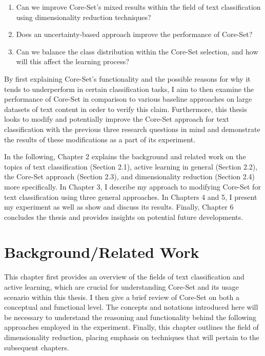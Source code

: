 \documentclass[english,bachelor,ul]{webisthesis} %
\begin{document}
\begin{enumerate}
    \item Can we improve Core-Set's mixed results within the field of text classification using dimensionality reduction techniques?
    \item Does an uncertainty-based approach improve the performance of Core-Set?
    \item Can we balance the class distribution within the Core-Set selection, and how will this affect the learning process?
\end{enumerate}



By first explaining Core-Set's functionality and the possible reasons for why it tends to underperform in certain classification tasks, I aim to then examine the performance of Core-Set in comparison to various baseline approaches on large datasets of text content in order to verify this claim. Furthermore, this thesis looks to modify and potentially improve the Core-Set approach for text classification with the previous three research questions in mind and demonstrate the results of these modifications as a part of its experiment.

In the following, Chapter 2 explains the background and related work on the topics of text classification (Section 2.1), active learning in general (Section 2.2), the Core-Set approach (Section 2.3), and dimensionality reduction (Section 2.4) more specifically. In Chapter 3, I describe my approach to modifying Core-Set for text classification using three general approaches. In Chapters 4 and 5, I present my experiment as well as show and discuss its results. Finally, Chapter 6 concludes the thesis and provides insights on potential future developments. 

\chapter{Background/Related Work}

This chapter first provides an overview of the fields of text classification and active learning, which are crucial for understanding Core-Set and its usage scenario within this thesis. I then give a brief review of Core-Set on both a conceptual and functional level. The concepts and notations introduced here will be necessary to understand the reasoning and functionality behind the following approaches employed in the experiment. Finally, this chapter outlines the field of dimensionality reduction, placing emphasis on techniques that will pertain to the subsequent chapters.
\end{document}
